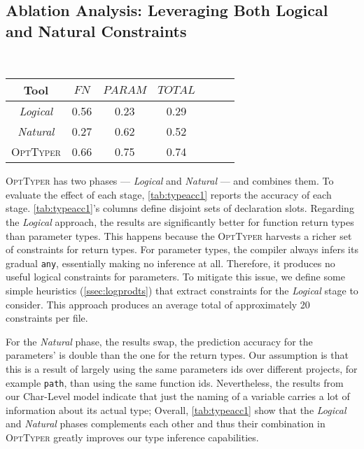 \documentclass[acmsmall, review, anonymous]{acmart}\settopmatter{printfolios=true,printccs=false,printacmref=false}
\newcommand{\projectname}{\textsc{OptTyper}\xspace}
\begin{document}
\subsection{Ablation Analysis:  Leveraging Both Logical and Natural Constraints}~\label{ssec:ablation}

\begin{table*}[t]
	\centering
	\caption{Ablation analysis of \projectname, the cells report accuracy; FN refers to return types of functions and PARAM
	represents parameters.}
\label{tab:typeacc1}
	\begin{tabular}{ccccccc}
		\toprule
		Tool  & $\textit{FN}$ & 
		$\textit{PARAM}$ & $\textit{TOTAL}$ \\
		
		\midrule
		\textit{Logical}      & 0.56                                   & 0.23                                 & 0.29                                  \\
		\textit{Natural}      & 0.27                                    & 0.62                                 & 0.52                                   \\
		\projectname  & 0.66         & 0.75         & 0.74\\
		\bottomrule
	\end{tabular}
\end{table*}
\projectname has two phases --- \textit{Logical} and \textit{Natural} --- and combines them.  To evaluate the effect of each stage, \cref{tab:typeacc1} reports the accuracy of each stage.
\cref{tab:typeacc1}'s columns define disjoint sets of declaration slots.
Regarding the \textit{Logical} approach, the results are significantly better for function return types
than parameter types.
This happens because the \projectname harvests a richer set of constraints for return types.
For parameter types, the compiler always 
infers its gradual \texttt{\small{any}}, essentially making no inference at all. Therefore, it produces no useful logical constraints for parameters.
To mitigate this issue, we define some simple heuristics (\cref{ssec:logprodts}) that extract constraints for the \textit{Logical} stage to consider. This approach produces an average total of approximately 20 constraints per file. 

For the \textit{Natural} phase, the results swap, the prediction accuracy for the parameters' is double than the one for the return types. Our assumption is that
this is a result of largely using the same parameters ids over different projects, for example \lstinline{path}, than using the same function ids. Nevertheless, the results from our Char-Level model indicate that just the naming of a variable carries a
lot of information about its actual type;   
Overall, \cref{tab:typeacc1} show that the \textit{Logical} and \textit{Natural} phases complements each other and thus their combination in \projectname greatly improves our type inference capabilities.
\end{document}
